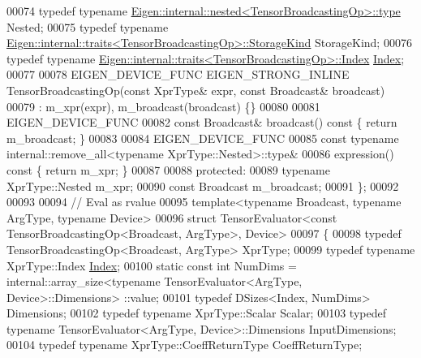 \begin{DoxyCode}
00074   \textcolor{keyword}{typedef} \textcolor{keyword}{typename} \hyperlink{class_eigen_1_1internal_1_1_tensor_lazy_evaluator_writable}{Eigen::internal::nested<TensorBroadcastingOp>::type}
       Nested;
00075   \textcolor{keyword}{typedef} \textcolor{keyword}{typename} \hyperlink{struct_eigen_1_1internal_1_1traits}{Eigen::internal::traits<TensorBroadcastingOp>::StorageKind}
       StorageKind;
00076   \textcolor{keyword}{typedef} \textcolor{keyword}{typename} \hyperlink{struct_eigen_1_1internal_1_1traits}{Eigen::internal::traits<TensorBroadcastingOp>::Index}
       \hyperlink{namespace_eigen_a62e77e0933482dafde8fe197d9a2cfde}{Index};
00077 
00078   EIGEN\_DEVICE\_FUNC EIGEN\_STRONG\_INLINE TensorBroadcastingOp(\textcolor{keyword}{const} XprType& expr, \textcolor{keyword}{const} Broadcast& 
      broadcast)
00079       : m\_xpr(expr), m\_broadcast(broadcast) \{\}
00080 
00081     EIGEN\_DEVICE\_FUNC
00082     \textcolor{keyword}{const} Broadcast& broadcast()\textcolor{keyword}{ const }\{ \textcolor{keywordflow}{return} m\_broadcast; \}
00083 
00084     EIGEN\_DEVICE\_FUNC
00085     \textcolor{keyword}{const} \textcolor{keyword}{typename} internal::remove\_all<typename XprType::Nested>::type&
00086     expression()\textcolor{keyword}{ const }\{ \textcolor{keywordflow}{return} m\_xpr; \}
00087 
00088   \textcolor{keyword}{protected}:
00089     \textcolor{keyword}{typename} XprType::Nested m\_xpr;
00090     \textcolor{keyword}{const} Broadcast m\_broadcast;
00091 \};
00092 
00093 
00094 \textcolor{comment}{// Eval as rvalue}
00095 \textcolor{keyword}{template}<\textcolor{keyword}{typename} Broadcast, \textcolor{keyword}{typename} ArgType, \textcolor{keyword}{typename} Device>
00096 \textcolor{keyword}{struct }TensorEvaluator<const TensorBroadcastingOp<Broadcast, ArgType>, Device>
00097 \{
00098   \textcolor{keyword}{typedef} TensorBroadcastingOp<Broadcast, ArgType> XprType;
00099   \textcolor{keyword}{typedef} \textcolor{keyword}{typename} XprType::Index \hyperlink{namespace_eigen_a62e77e0933482dafde8fe197d9a2cfde}{Index};
00100   \textcolor{keyword}{static} \textcolor{keyword}{const} \textcolor{keywordtype}{int} NumDims = internal::array\_size<typename TensorEvaluator<ArgType, Device>::Dimensions>
      ::value;
00101   \textcolor{keyword}{typedef} DSizes<Index, NumDims> Dimensions;
00102   \textcolor{keyword}{typedef} \textcolor{keyword}{typename} XprType::Scalar Scalar;
00103   \textcolor{keyword}{typedef} \textcolor{keyword}{typename} TensorEvaluator<ArgType, Device>::Dimensions InputDimensions;
00104   \textcolor{keyword}{typedef} \textcolor{keyword}{typename} XprType::CoeffReturnType CoeffReturnType;

\end{DoxyCode}
